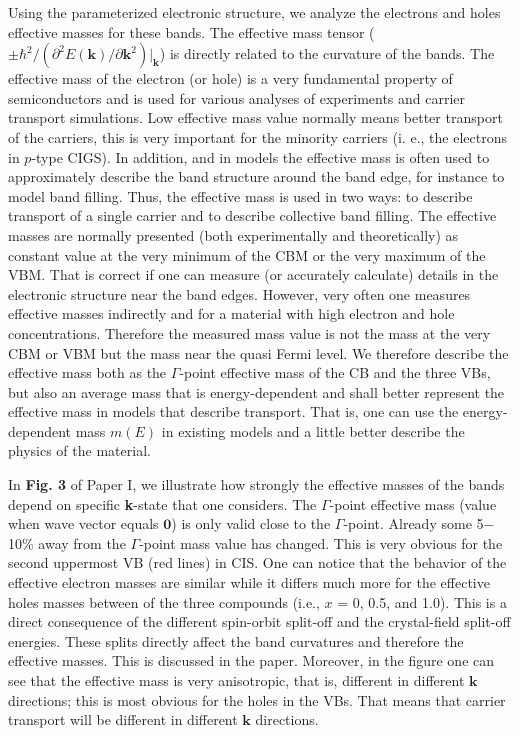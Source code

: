 \documentclass[a4paper, 12pt, titlepage,oneside,drop]{kthesis}
\begin{document}
Using the parameterized electronic structure, we analyze the electrons and holes effective masses for these bands. 
The effective mass tensor ($\pm \hbar^2 / (\partial^2E(\mathbf{k})/\partial{\mathbf{k}^2})|_\textbf{k} $) is directly related to the curvature of the bands. The effective mass of the electron (or hole) is a very fundamental property of
semiconductors and is used for various
analyses of experiments and carrier transport simulations. Low effective mass value normally means better transport of the carriers, this is very important for the minority carriers
(i. e., the electrons in $p$-type CIGS). In addition, and in models the effective mass is often used to approximately describe the band structure around the band edge, for instance to model band filling. Thus, the effective mass
is used in two ways: to describe transport of a single carrier and to describe collective band filling. The effective masses are normally presented (both experimentally and theoretically) as constant value at the very minimum
of the CBM or the very maximum of the VBM. That is correct if one can measure (or accurately calculate) details in the electronic structure near the band edges. However, very often one measures effective masses indirectly and for
a material with high electron and hole concentrations. Therefore the measured mass value is not the mass at the very CBM or VBM but the mass near the quasi Fermi level. We therefore describe the effective mass both
as the $\Gamma$-point effective mass of the CB and the three VBs, but also an average mass that is energy-dependent and shall better represent the effective mass in models that describe transport. That is, one can use the
energy-dependent mass $m(E)$ in existing models and a little better describe the physics of the material.      

In \textbf{Fig. 3} of Paper I, we illustrate how strongly the effective masses of the bands depend on specific \textbf{k}-state that one considers. The $\Gamma$-point effective mass (value when wave vector equals $\mathbf{0}$) 
is only valid close to the $\Gamma$-point. Already some 5$-$10\% away from the $\Gamma$-point mass value has changed. This is very obvious for the second uppermost VB (red lines) in CIS. One can notice that the behavior of
the effective electron masses are similar while it differs much more for the effective holes masses between of the three compounds (i.e., $x$ = 0, 0.5, and 1.0). 
This is a direct consequence of the different spin-orbit split-off and the crystal-field split-off energies. These splits directly affect the band curvatures and therefore the effective masses. This is discussed in the paper. Moreover, in the figure one can see that the effective mass is very anisotropic, that is, different 
in different $\mathbf{k}$ directions; this is most obvious for the holes in the VBs. That means that carrier transport will be different in different $\textbf{k}$ directions.  
\end{document}
